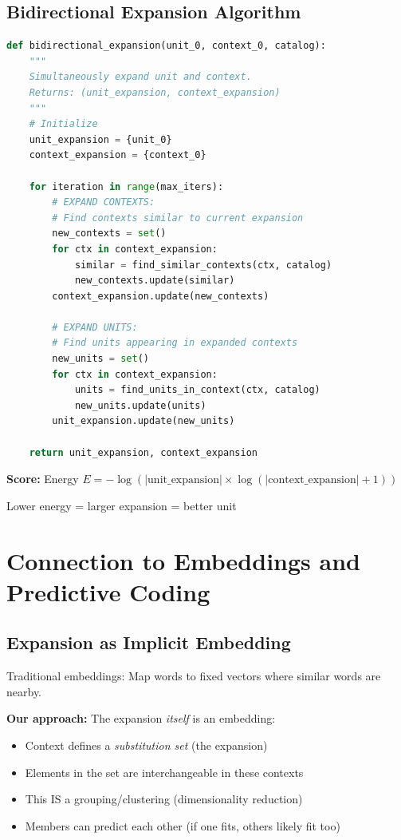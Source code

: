 \documentclass[11pt]{article}
\begin{document}
\subsection{Bidirectional Expansion Algorithm}

\begin{lstlisting}[language=Python, basicstyle=\small\ttfamily]
def bidirectional_expansion(unit_0, context_0, catalog):
    """
    Simultaneously expand unit and context.
    Returns: (unit_expansion, context_expansion)
    """
    # Initialize
    unit_expansion = {unit_0}
    context_expansion = {context_0}

    for iteration in range(max_iters):
        # EXPAND CONTEXTS:
        # Find contexts similar to current expansion
        new_contexts = set()
        for ctx in context_expansion:
            similar = find_similar_contexts(ctx, catalog)
            new_contexts.update(similar)
        context_expansion.update(new_contexts)

        # EXPAND UNITS:
        # Find units appearing in expanded contexts
        new_units = set()
        for ctx in context_expansion:
            units = find_units_in_context(ctx, catalog)
            new_units.update(units)
        unit_expansion.update(new_units)

    return unit_expansion, context_expansion
\end{lstlisting}

\textbf{Score:} Energy $E = -\log(|\text{unit\_expansion}| \times \log(|\text{context\_expansion}| + 1))$

Lower energy = larger expansion = better unit

\section{Connection to Embeddings and Predictive Coding}

\subsection{Expansion as Implicit Embedding}

Traditional embeddings: Map words to fixed vectors where similar words are nearby.

\textbf{Our approach:} The expansion \emph{itself} is an embedding:
\begin{itemize}
\item Context defines a \emph{substitution set} (the expansion)
\item Elements in the set are interchangeable in these contexts
\item This IS a grouping/clustering (dimensionality reduction)
\item Members can predict each other (if one fits, others likely fit too)
\end{itemize}
\end{document}
